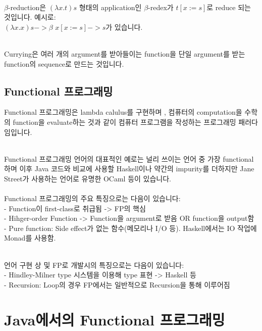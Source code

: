 \documentclass[runningheads]{llncs}
\begin{document}
\noindent \\
$\beta$-reduction은 $(\lambda x.t)s$ 형태의 application인 $\beta$-redex가 $t[x:=s]$로 reduce 되는 것입니다. 예시로:\\
$(\lambda x.x)s ->\beta$ $x[x:=s] -> s$가 있습니다.

\noindent \\
Currying은 여러 개의 argument를 받아들이는 function을 단일 argument를 받는 function의 sequence로 만드는 것입니다.

\subsection{Functional 프로그래밍}

Functional 프로그래밍은 lambda calulus를 구현하며 \cite{ref_wiki_functional_programming}, 
컴퓨터의 computation을 수학의 function을 evaluate하는 것과 같이 컴퓨터 프로그램을 작성하는 프로그래밍 패러다임입니다\cite{ref_baeldung_java_functional_programming}.

\noindent
\\
Functional 프로그래밍 언어의 대표적인 예로는 널리 쓰이는 언어 중 가장 functional하며 이후 Java 코드와 비교에 사용할 Haskell\cite{ref_haskell_website}이나 약간의 impurity를 더하지만 
Jane Street가 사용하는 언어로 유명한 OCaml\cite{ref_ocaml} 등이 있습니다.\\ 

\noindent
\\
Functional 프로그래밍의 주요 특징으로는 다음이 있습니다\cite{ref_wiki_functional_programming}\cite{ref_baeldung_java_functional_programming}: \\
- Function이 first-class로 취급됨 -> FP의 핵심 \\
- Hihger-order Function -> Function을 argument로 받음 OR function을 output함\cite{ref_wiki_higher_order_function}\\
- Pure function: Side effect가 없는 함수(메모리나 I/O 등). Haskell에서는 IO 작업에 Monad를 사용함.

\noindent
\\
언어 구현 상 및 FP로 개발시의 특징으로는 다음이 있습니다: \\
- Hindley-Milner type 시스템을 이용해 type 표현 -> Haskell 등\cite{ref_wiki_hindley_milner_type_system}\\
- Recursion: Loop의 경우 FP에서는 일반적으로 Recursion을 통해 이루어짐 \\

\section{Java에서의 Functional 프로그래밍}
\end{document}
